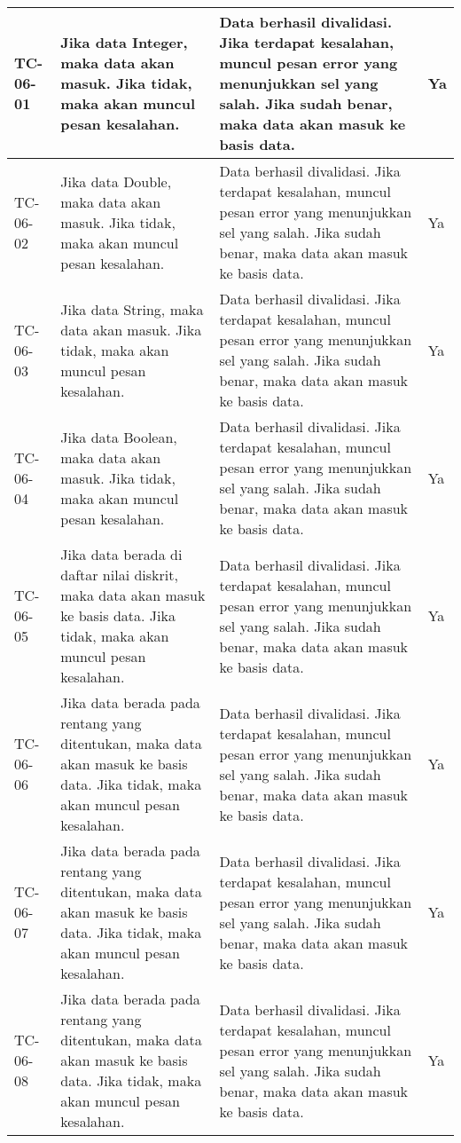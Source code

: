 \begin{small}
\begin{longtable}{ | p{2cm} | p{4cm} | p{4cm} | p{2cm} | }
	\\ \hline TC-06-01 & Jika data Integer, maka data akan masuk. Jika tidak, maka akan muncul pesan kesalahan. & Data berhasil divalidasi. Jika terdapat kesalahan, muncul pesan error yang menunjukkan sel yang salah. Jika sudah benar, maka data akan masuk ke basis data. & Ya
	\\ \hline TC-06-02 & Jika data Double, maka data akan masuk. Jika tidak, maka akan muncul pesan kesalahan. & Data berhasil divalidasi. Jika terdapat kesalahan, muncul pesan error yang menunjukkan sel yang salah. Jika sudah benar, maka data akan masuk ke basis data. & Ya
	\\ \hline TC-06-03 & Jika data String, maka data akan masuk. Jika tidak, maka akan muncul pesan kesalahan. & Data berhasil divalidasi. Jika terdapat kesalahan, muncul pesan error yang menunjukkan sel yang salah. Jika sudah benar, maka data akan masuk ke basis data. & Ya
	\\ \hline TC-06-04 & Jika data Boolean, maka data akan masuk. Jika tidak, maka akan muncul pesan kesalahan. & Data berhasil divalidasi. Jika terdapat kesalahan, muncul pesan error yang menunjukkan sel yang salah. Jika sudah benar, maka data akan masuk ke basis data. & Ya
	\\ \hline TC-06-05 & Jika data berada di daftar nilai diskrit, maka data akan masuk ke basis data. Jika tidak, maka akan muncul pesan kesalahan. & Data berhasil divalidasi. Jika terdapat kesalahan, muncul pesan error yang menunjukkan sel yang salah. Jika sudah benar, maka data akan masuk ke basis data. & Ya
	\\ \hline TC-06-06 & Jika data berada pada rentang yang ditentukan, maka data akan masuk ke basis data. Jika tidak, maka akan muncul pesan kesalahan. & Data berhasil divalidasi. Jika terdapat kesalahan, muncul pesan error yang menunjukkan sel yang salah. Jika sudah benar, maka data akan masuk ke basis data. & Ya
	\\ \hline TC-06-07 & Jika data berada pada rentang yang ditentukan, maka data akan masuk ke basis data. Jika tidak, maka akan muncul pesan kesalahan. & Data berhasil divalidasi. Jika terdapat kesalahan, muncul pesan error yang menunjukkan sel yang salah. Jika sudah benar, maka data akan masuk ke basis data. & Ya
	\\ \hline TC-06-08 & Jika data berada pada rentang yang ditentukan, maka data akan masuk ke basis data. Jika tidak, maka akan muncul pesan kesalahan. & Data berhasil divalidasi. Jika terdapat kesalahan, muncul pesan error yang menunjukkan sel yang salah. Jika sudah benar, maka data akan masuk ke basis data. & Ya

\end{longtable}
\end{small}
